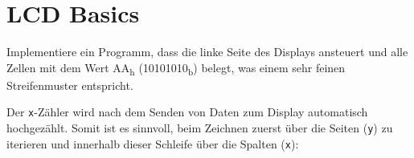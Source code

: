\section{LCD Basics}
Implementiere ein Programm, dass die linke Seite des Displays ansteuert und alle Zellen mit dem Wert AA\textsubscript{h} (10101010\textsubscript{b}) belegt, was einem sehr feinen Streifenmuster entspricht.

Der \lstinline{x}-Zähler wird nach dem Senden von Daten zum Display automatisch hochgezählt.
Somit ist es sinnvoll, beim Zeichnen zuerst über die Seiten (\lstinline{y}) zu iterieren und innerhalb dieser Schleife über die Spalten (\lstinline{x}):


